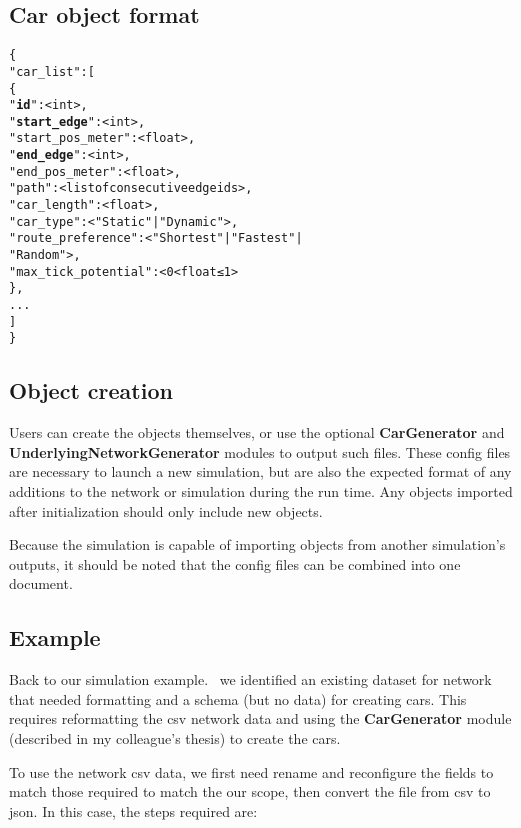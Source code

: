 \subsection{Car object format}

\begin{alltt}
\{
    "car_list": [
        \{
            "\textbf{id}": <int>,
            "\textbf{start_edge}": <int>, 
            "start_pos_meter": <float>, 
            "\textbf{end_edge}": <int>,
            "end_pos_meter": <float>,
            "path": <list of consecutive edge ids>,
            "car_length": <float>, 
            "car_type": <"Static" | "Dynamic">,
            "route_preference": <"Shortest" | "Fastest" | 
                                 "Random">,
            "max_tick_potential": <0 < float ≤ 1>
        \},
        ...
    ]
\}
\end{alltt}

\subsection{Object creation}

\par Users can create the objects themselves, or use the optional \textbf{CarGenerator} and \textbf{UnderlyingNetworkGenerator} modules to output such files. These config files are necessary to launch a new simulation, but are also the expected format of any additions to the network or simulation during the run time.  Any objects imported after initialization should only include new objects.\\

\par Because the simulation is capable of importing objects from another simulation's outputs, it should be noted that the config files can be combined into one document.  


\subsection{Example}
 \par  Back to our simulation example. \ we identified an existing dataset for network that needed formatting and a schema (but no data) for creating cars.  This requires reformatting the csv network data and using the \textbf{CarGenerator} module (described in my colleague's thesis) to create the cars. \\
 
\par To use the network csv data, we first need rename and reconfigure the fields to match those required to match the our scope, then convert the file from csv to json.  In this case, the steps required are:

